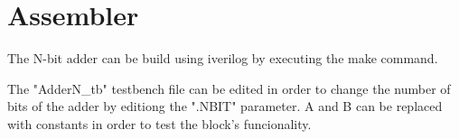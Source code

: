 \section{Assembler}
\label{sec:progex}

The N-bit adder can be build using iverilog by executing the make command.


The "AdderN\_tb" testbench file can be edited in order to change the number of bits of the adder by editiong the ".NBIT" parameter.
A and B can be replaced with constants in order to test the block's funcionality.
